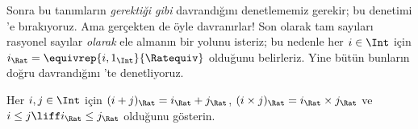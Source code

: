 Sonra bu tanımların \emph{gerektiği gibi} davrandığını denetlememiz gerekir;
bu denetimi 'e bırakıyoruz. Ama gerçekten de öyle
davranırlar!{} Son olarak tam sayıları rasyonel sayılar \emph{olarak} ele
almanın bir yolunu isteriz; bu nedenle her $i \in \Int$ için
$i_\Rat = \equivrep{i, 1_\Int}{\Ratequiv}$ olduğunu belirleriz. Yine bütün
bunların doğru davrandığını 'te denetliyoruz.

\begin{prob}
Her $i, j \in \Int$ için $(i + j)_\Rat = i_\Rat+ j_\Rat$,
$(i \times j)_\Rat = i_\Rat \times j_\Rat$ ve
$i \leq j \liff i_\Rat \leq j_\Rat$ olduğunu gösterin.
\end{prob}

